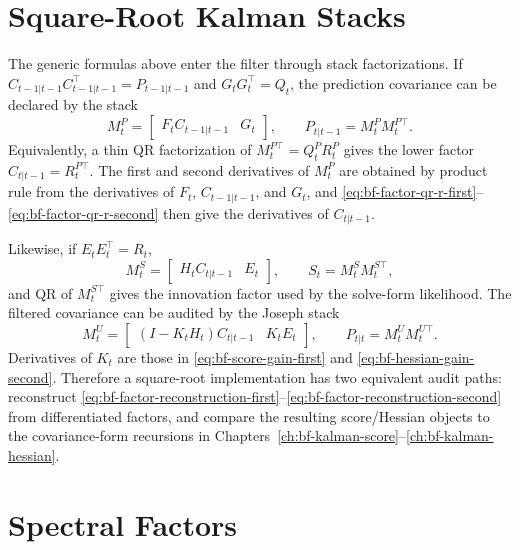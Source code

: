 \section{Square-Root Kalman Stacks}
\label{sec:bf-factor-kalman-stacks}

The generic formulas above enter the filter through stack factorizations.  If
$C_{t-1|t-1}C_{t-1|t-1}^\top=P_{t-1|t-1}$ and
$G_tG_t^\top=Q_t$, the prediction covariance can be declared by the stack
\[
  M_t^P =
  \begin{bmatrix}
    F_tC_{t-1|t-1} & G_t
  \end{bmatrix},
  \qquad
  P_{t|t-1}=M_t^PM_t^{P\top}.
\]
Equivalently, a thin QR factorization of $M_t^{P\top}=Q_t^PR_t^P$ gives the
lower factor $C_{t|t-1}=R_t^{P\top}$.  The first and second derivatives of
$M_t^P$ are obtained by product rule from the derivatives of
$F_t$, $C_{t-1|t-1}$, and $G_t$, and
\eqref{eq:bf-factor-qr-r-first}--\eqref{eq:bf-factor-qr-r-second} then give the
derivatives of $C_{t|t-1}$.

Likewise, if $E_tE_t^\top=R_t$,
\[
  M_t^S =
  \begin{bmatrix}
    H_tC_{t|t-1} & E_t
  \end{bmatrix},
  \qquad
  S_t=M_t^SM_t^{S\top},
\]
and QR of $M_t^{S\top}$ gives the innovation factor used by the solve-form
likelihood.  The filtered covariance can be audited by the Joseph stack
\[
  M_t^U =
  \begin{bmatrix}
    (I-K_tH_t)C_{t|t-1} & K_tE_t
  \end{bmatrix},
  \qquad
  P_{t|t}=M_t^UM_t^{U\top}.
\]
Derivatives of $K_t$ are those in
\eqref{eq:bf-score-gain-first} and
\eqref{eq:bf-hessian-gain-second}.  Therefore a square-root implementation has
two equivalent audit paths: reconstruct
\eqref{eq:bf-factor-reconstruction-first}--\eqref{eq:bf-factor-reconstruction-second}
from differentiated factors, and compare the resulting score/Hessian objects to
the covariance-form recursions in Chapters~\ref{ch:bf-kalman-score}--\ref{ch:bf-kalman-hessian}.

\section{Spectral Factors}
\label{sec:bf-factor-spectral}

